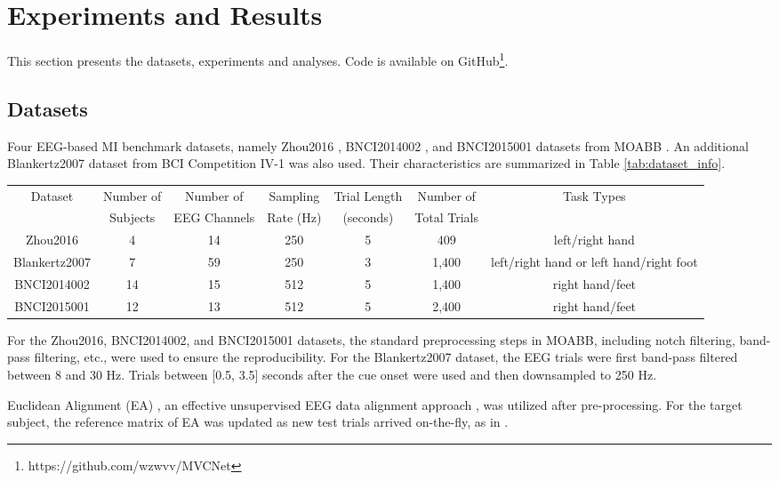 \documentclass[journal]{IEEEtran}
\begin{document}
\section{Experiments and Results}\label{sect:er}
This section presents the datasets, experiments and analyses. Code is available on GitHub\footnote{https://github.com/wzwvv/MVCNet}.

\subsection{Datasets}
Four EEG-based MI benchmark datasets, namely Zhou2016 \cite{Zhou2016}, BNCI2014002 \cite{Steyrl2016BNCI2014002}, and BNCI2015001 \cite{Faller2012BNCI2015001} datasets from MOABB \cite{Jayaram2018}. An additional Blankertz2007 \cite{Blankertz2007MI1} dataset from BCI Competition IV-1 was also used. Their characteristics are summarized in Table \ref{tab:dataset_info}.
\begin{table*}[htpb]  \centering \setlength{\tabcolsep}{1mm} 
\caption{Summary of the used MI datasets.}  
\footnotesize
\label{tab:dataset_info}
\begin{tabular}{c|c|c|c|c|c|c}
\toprule
\multirow{2}{*}{Dataset} & Number of & Number of & Sampling & Trial Length & Number of & \multirow{2}{*}{Task Types} \\
 & Subjects & EEG Channels & Rate (Hz) & (seconds) & Total Trials & \\
\midrule
Zhou2016 & 4 & 14 & 250 & 5 & 409 & left/right hand\\
Blankertz2007 & 7 & 59 & 250 & 3 & 1,400 & left/right hand or left hand/right foot \\
BNCI2014002 & 14 & 15 & 512 & 5 & 1,400 & right hand/feet \\
BNCI2015001 & 12 & 13 & 512 & 5 & 2,400 & right hand/feet \\
\bottomrule
\end{tabular}
\end{table*}

For the Zhou2016, BNCI2014002, and BNCI2015001 datasets, the standard preprocessing steps in MOABB, including notch filtering, band-pass filtering, etc., were used to ensure the reproducibility. For the Blankertz2007 dataset, the EEG trials were first band-pass filtered between 8 and 30 Hz. Trials between [0.5, 3.5] seconds after the cue onset were used and then downsampled to 250 Hz. 

Euclidean Alignment (EA) \cite{He2020EA}, an effective unsupervised EEG data alignment approach \cite{Wu2022NN}, was utilized after pre-processing. For the target subject, the reference matrix of EA was updated as new test trials arrived on-the-fly, as in \cite{Li2024T-TIME}. 
\end{document}
